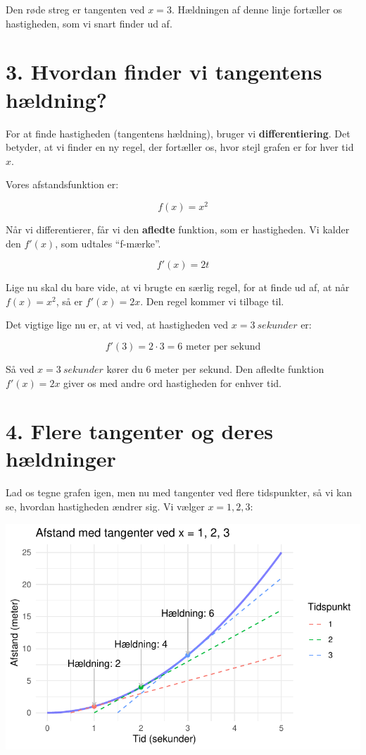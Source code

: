 \documentclass[
  letterpaper,
  DIV=11,
  numbers=noendperiod]{scrreprt}
\begin{document}
Den røde streg er tangenten ved \(x=3\). Hældningen af denne linje
fortæller os hastigheden, som vi snart finder ud af.

\section{3. Hvordan finder vi tangentens
hældning?}\label{hvordan-finder-vi-tangentens-huxe6ldning}

For at finde hastigheden (tangentens hældning), bruger vi
\textbf{differentiering}. Det betyder, at vi finder en ny regel, der
fortæller os, hvor stejl grafen er for hver tid \(x\).

Vores afstandsfunktion er:

\[ f(x) = x^2 \]

Når vi differentierer, får vi den \textbf{afledte} funktion, som er
hastigheden. Vi kalder den \(f'(x)\), som udtales ``f-mærke''.

\[ f'(x) = 2t \]

Lige nu skal du bare vide, at vi brugte en særlig regel, for at finde ud
af, at når \(f(x)=x^2\), så er \(f'(x) = 2x\). Den regel kommer vi
tilbage til.

Det vigtige lige nu er, at vi ved, at hastigheden ved
\(x = 3\ sekunder\) er:

\[ f'(3) = 2 \cdot 3 = 6 \text{ meter per sekund} \]

Så ved \(x=3\ sekunder\) kører du 6 meter per sekund. Den afledte
funktion \(f'(x)=2x\) giver os med andre ord hastigheden for enhver tid.

\section{4. Flere tangenter og deres
hældninger}\label{flere-tangenter-og-deres-huxe6ldninger}

Lad os tegne grafen igen, men nu med tangenter ved flere tidspunkter, så
vi kan se, hvordan hastigheden ændrer sig. Vi vælger \(x=1,2,3\):

\includegraphics{differentialregning_files/figure-pdf/flere-tangenter-1.pdf}
\end{document}
